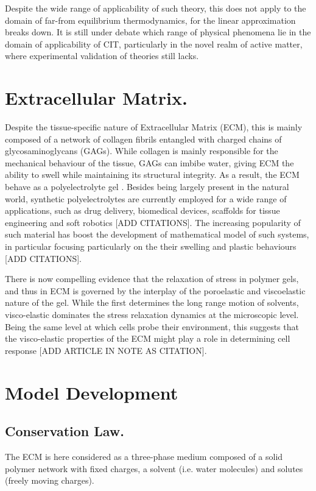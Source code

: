 \documentclass[runningheads]{llncs}
\begin{document}
Despite the wide range of applicability of such theory, this does not apply to the domain of far-from equilibrium thermodynamics, for the linear approximation breaks down. It is still under debate which range of physical phenomena lie in the domain of applicability of CIT, particularly in the novel realm of active matter, where experimental validation of theories still lacks.

\section{Extracellular Matrix.}
Despite the tissue-specific nature of Extracellular Matrix (ECM), this is mainly composed of a network of collagen fibrils entangled with charged chains of glycosaminoglycans (GAGs). While collagen is mainly responsible for the mechanical behaviour of the tissue, GAGs can imbibe water, giving ECM the ability to swell while maintaining its structural integrity. As a result, the ECM behave as a polyelectrolyte gel \cite{ecm,ecm2}. Besides being largely present in the natural world, synthetic polyelectrolytes are currently employed for a wide range of applications, such as drug delivery, biomedical devices, scaffolds for tissue engineering and soft robotics [ADD CITATIONS]. The increasing popularity of such material has boost the development of mathematical model of such systems, in particular focusing particularly on the their swelling and plastic behaviours [ADD CITATIONS].

There is now compelling evidence that the relaxation of stress in polymer gels, and thus in ECM is governed by the interplay of the poroelastic and viscoelastic nature of the gel. While the first determines the long range motion of solvents, visco-elastic dominates the stress relaxation dynamics at the microscopic level. Being the same level at which cells probe their environment, this suggests that the visco-elastic properties of the ECM might play a role in determining cell response [ADD ARTICLE IN NOTE AS CITATION].


\section{Model Development}
\subsection{Conservation Law.}

The ECM is here considered as a three-phase medium composed of a solid polymer network with fixed charges, a solvent (i.e. water molecules) and solutes (freely moving charges).
\end{document}
